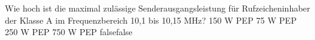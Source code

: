     {Wie hoch ist die maximal zulässige Senderausgangsleistung für Rufzeicheninhaber der Klasse A im Frequenzbereich 10,1 bis 10,15 MHz?}
    {150 W PEP}
    {75 W PEP}
    {250 W PEP}
    {750 W PEP}
    {false}{false}